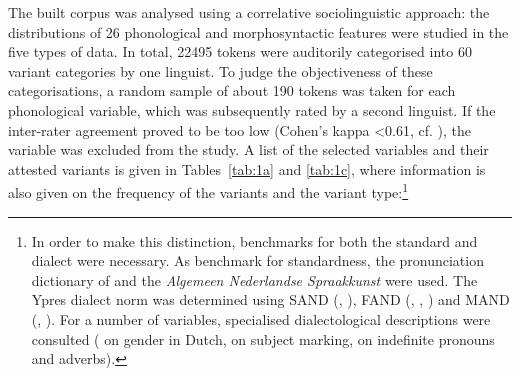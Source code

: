 \documentclass[output=paper]{LSP/langsci}
\begin{document}
The built corpus was analysed using a correlative sociolinguistic approach: the distributions of 26 phonological and morphosyntactic features were studied in the five types of data. In total, 22495 tokens were auditorily categorised into 60 variant categories by one linguist. To judge the objectiveness of these categorisations, a random sample of about 190 tokens was taken for each phonological variable, which was subsequently rated by a second linguist. If the inter-rater agreement proved to be too low (Cohen's kappa {\textless}0.61, cf. \citealt[165]{landis_measurement_1977}), the variable was excluded from the study. A list of the selected variables and their attested variants is given in Tables~\ref{tab:1a} and \ref{tab:1c}, where information is also given on the frequency of the variants and the variant type:\footnote{In order to make this distinction, benchmarks for both the standard and dialect were necessary. As benchmark for standardness, the pronunciation dictionary of \citet{heemskerk_uitspraakwoordenboek_2000} and the \textit{Algemeen Nederlandse Spraakkunst} \citep{ANS} were used. The Ypres dialect norm was determined using SAND (\citealt{barbiers_syntactische_2005}, \citealt{barbiers_syntactische_2008}), 
FAND (\citealt{de_wulf_fonologische_2005}, \citealt{goossens_fonologische_2000}, \citealt{goossens_fonologische_1998}) and 
MAND (\citealt{de_schutter_morfologische_2005}, \citealt{goeman_mand_2008}). For a number of variables, specialised dialectological descriptions were consulted (\citealt{cornips_variatie_2009} on gender in Dutch, \citealt{de_vogelaer_nederlandse_2008} on subject marking, \citealt{de_vogelaer_iemand_2006} on indefinite pronouns and adverbs).}
\end{document}
